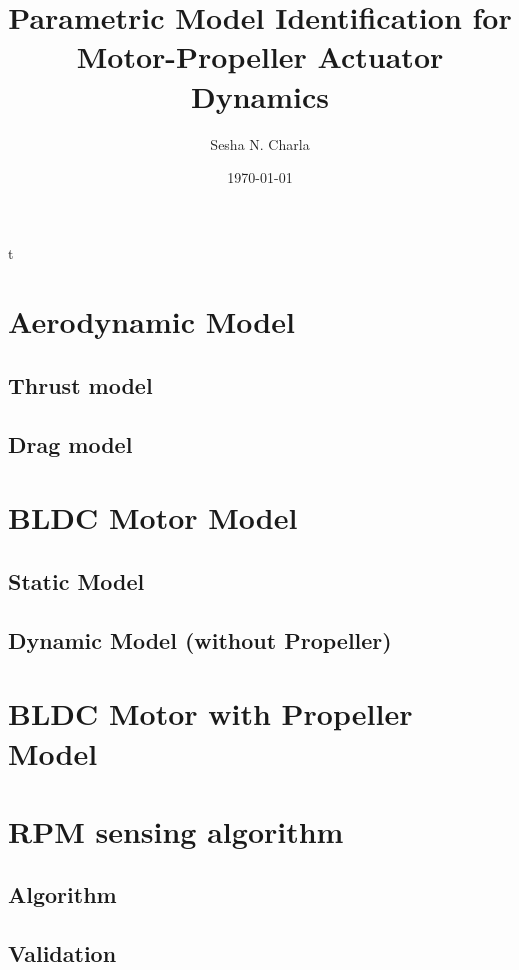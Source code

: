 t \documentclass[letterpaper, 11pt]{article}
\title{Parametric Model Identification for Motor-Propeller Actuator Dynamics}
\author{Sesha N. Charla}
\date{\today}
\begin{document}
\maketitle
\tableofcontents
\newpage
\section{Aerodynamic Model}
\subsection{Thrust model}
\subsection{Drag model}
\newpage


\section{BLDC Motor Model}
\subsection{Static Model}
\subsection{Dynamic Model (without Propeller)}
\newpage


\section{BLDC Motor with Propeller Model}
\newpage


\section{RPM sensing algorithm}
\subsection{Algorithm}
\subsection{Validation}
\newpage
\end{document}
